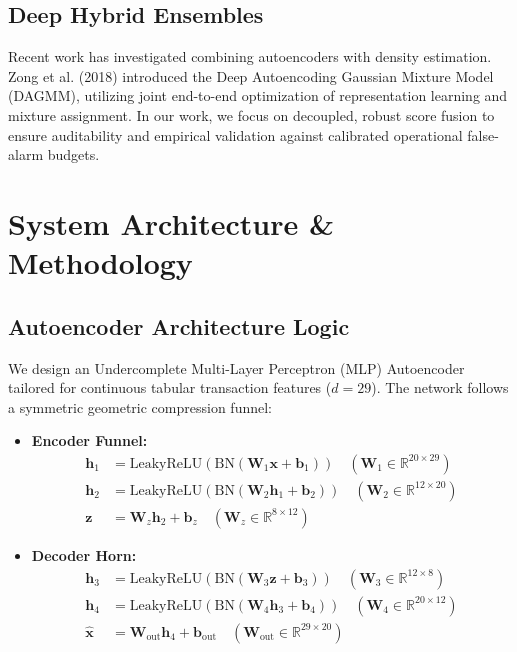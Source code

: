 \documentclass[10pt,journal,compsoc]{IEEEtran}
\begin{document}
\subsection{Deep Hybrid Ensembles}
Recent work has investigated combining autoencoders with density estimation. Zong et al. (2018) \cite{zong2018deep} introduced the Deep Autoencoding Gaussian Mixture Model (DAGMM), utilizing joint end-to-end optimization of representation learning and mixture assignment. In our work, we focus on decoupled, robust score fusion to ensure auditability and empirical validation against calibrated operational false-alarm budgets.

\section{System Architecture \& Methodology}
\subsection{Autoencoder Architecture Logic}
We design an Undercomplete Multi-Layer Perceptron (MLP) Autoencoder tailored for continuous tabular transaction features ($d=29$). The network follows a symmetric geometric compression funnel:

\begin{itemize}
    \item \textbf{Encoder Funnel:}
    \begin{align}
        \mathbf{h}_1 &= \text{LeakyReLU}\left(\text{BN}\left(\mathbf{W}_1 \mathbf{x} + \mathbf{b}_1\right)\right) \quad (\mathbf{W}_1 \in \mathbb{R}^{20 \times 29}) \\
        \mathbf{h}_2 &= \text{LeakyReLU}\left(\text{BN}\left(\mathbf{W}_2 \mathbf{h}_1 + \mathbf{b}_2\right)\right) \quad (\mathbf{W}_2 \in \mathbb{R}^{12 \times 20}) \\
        \mathbf{z} &= \mathbf{W}_z \mathbf{h}_2 + \mathbf{b}_z \quad (\mathbf{W}_z \in \mathbb{R}^{8 \times 12})
    \end{align}
    \item \textbf{Decoder Horn:}
    \begin{align}
        \mathbf{h}_3 &= \text{LeakyReLU}\left(\text{BN}\left(\mathbf{W}_3 \mathbf{z} + \mathbf{b}_3\right)\right) \quad (\mathbf{W}_3 \in \mathbb{R}^{12 \times 8}) \\
        \mathbf{h}_4 &= \text{LeakyReLU}\left(\text{BN}\left(\mathbf{W}_4 \mathbf{h}_3 + \mathbf{b}_4\right)\right) \quad (\mathbf{W}_4 \in \mathbb{R}^{20 \times 12}) \\
        \mathbf{\hat{x}} &= \mathbf{W}_{\text{out}} \mathbf{h}_4 + \mathbf{b}_{\text{out}} \quad (\mathbf{W}_{\text{out}} \in \mathbb{R}^{29 \times 20})
    \end{align}
\end{itemize}
\end{document}
